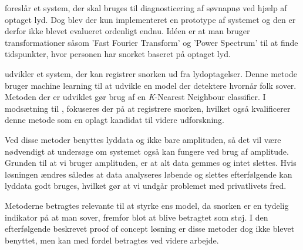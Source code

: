\citet{Calabrese20111101} foreslår et system, der skal bruges til diagnosticering af søvnapnø ved hjælp af optaget lyd.
Dog blev der kun implementeret en prototype af systemet og den er derfor ikke blevet evalueret ordenligt endnu. 
Idéen er at man bruger transformationer såsom 'Fast Fourier Transform' og 'Power Spectrum' til at finde tidspunkter, hvor personen har snorket baseret på optaget lyd. 

\citet{7051338} udvikler et system, der kan registrer snorken ud fra lydoptagelser.
Denne metode bruger machine learning til at udvikle en model der detektere hvornår folk sover.
Metoden der er udviklet gør brug af en \textit{K}-Nearest Neighbour classifier.
I modsætning til \citet{Calabrese20111101}, fokuseres der på at registrere snorken, hvilket også kvalificerer denne metode som en oplagt kandidat til videre udforskning.

Ved disse metoder benyttes lyddata og ikke bare amplituden, så det vil være nødvendigt at undersøge om systemet også kan fungere ved brug af amplitude.
Grunden til at vi bruger amplituden, er at alt data gemmes og intet slettes. 
Hvis løsningen ændres således at data analyseres løbende og slettes efterfølgende kan lyddata godt bruges, hvilket gør at vi undgår problemet med privatlivets fred.

Metoderne betragtes relevante til at styrke ens model, da snorken er en tydelig indikator på at man sover, fremfor blot at blive betragtet som støj.
I den efterfølgende beskrevet proof of concept løsning er disse metoder dog ikke blevet benyttet, men kan med fordel betragtes ved videre arbejde.